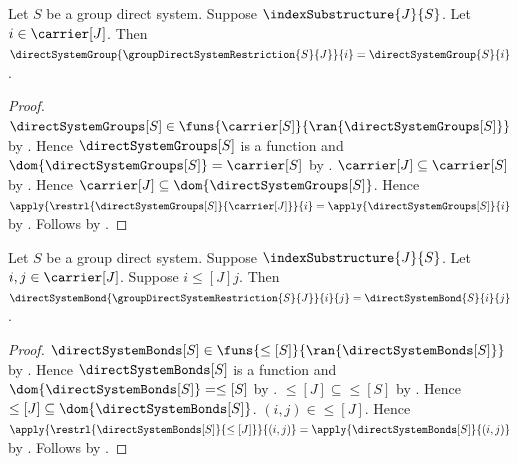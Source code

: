 \begin{proposition}\label{group_direct_system_restriction_group}
    Let $S$ be a group direct system.
    Suppose $\indexSubstructure{J}{S}$.
    Let $i\in\carrier[J]$.
    Then $\directSystemGroup{\groupDirectSystemRestriction{S}{J}}{i}
        =\directSystemGroup{S}{i}$.
\end{proposition}
\begin{proof}
    $\directSystemGroups[S]\in
        \funs{\carrier[S]}{\ran{\directSystemGroups[S]}}$ by
        .
    Hence $\directSystemGroups[S]$ is a function and
        $\dom{\directSystemGroups[S]}=\carrier[S]$ by
        .
    $\carrier[J]\subseteq\carrier[S]$ by
        .
    Hence $\carrier[J]\subseteq\dom{\directSystemGroups[S]}$.
    Hence
        $\apply{\restrl{\directSystemGroups[S]}{\carrier[J]}}{i}
            =\apply{\directSystemGroups[S]}{i}$ by
        .
    Follows by
        .
\end{proof}

\begin{proposition}\label{group_direct_system_restriction_bond}
    Let $S$ be a group direct system.
    Suppose $\indexSubstructure{J}{S}$.
    Let $i,j\in\carrier[J]$.
    Suppose $i\mathrel{\leq[J]}j$.
    Then $\directSystemBond{\groupDirectSystemRestriction{S}{J}}{i}{j}
        =\directSystemBond{S}{i}{j}$.
\end{proposition}
\begin{proof}
    $\directSystemBonds[S]\in
        \funs{\leq[S]}{\ran{\directSystemBonds[S]}}$ by
        .
    Hence $\directSystemBonds[S]$ is a function and
        $\dom{\directSystemBonds[S]}=\leq[S]$ by
        .
    $\leq[J]\subseteq\leq[S]$ by
        .
    Hence $\leq[J]\subseteq\dom{\directSystemBonds[S]}$.
    $(i,j)\in\leq[J]$.
    Hence
        $\apply{\restrl{\directSystemBonds[S]}{\leq[J]}}{(i,j)}
            =\apply{\directSystemBonds[S]}{(i,j)}$ by
        .
    Follows by
        .
\end{proof}

